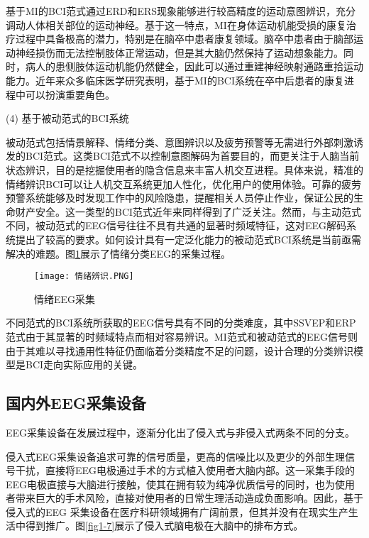 基于MI的BCI范式通过ERD和ERS现象能够进行较高精度的运动意图辨识，充分调动人体相关部位的运动神经。基于这一特点，MI在身体运动机能受损的康复治疗过程中具备极高的潜力，特别是在脑卒中患者康复领域\cite{1-44,1-45}。脑卒中患者由于脑部运动神经损伤而无法控制肢体正常运动，但是其大脑仍然保持了运动想象能力。同时，病人的患侧肢体运动机能仍然健全，因此可以通过重建神经映射通路重拾运动能力\cite{1-46,1-47}。近年来众多临床医学研究表明，基于MI的BCI系统在卒中后患者的康复进程中可以扮演重要角色\cite{1-48,1-102}。

(4) 基于被动范式的BCI系统

被动范式包括情景解释、情绪分类、意图辨识以及疲劳预警等无需进行外部刺激诱发的BCI范式\cite{1-36}。这类BCI范式不以控制意图解码为首要目的，而更关注于人脑当前状态辨识，目的是挖掘使用者的隐含信息来丰富人机交互进程。具体来说，精准的情绪辨识BCI可以让人机交互系统更加人性化，优化用户的使用体验。可靠的疲劳预警系统能够及时发现工作中的风险隐患，提醒相关人员停止作业，保证公民的生命财产安全。这一类型的BCI范式近年来同样得到了广泛关注\cite{3-28,3-29,3-30}。然而，与主动范式不同，被动范式的EEG信号往往不具有共通的显著时频域特征，这对EEG解码系统提出了较高的要求\cite{3-31}。如何设计具有一定泛化能力的被动范式BCI系统是当前亟需解决的难题。图\ref{fig1-6}展示了情绪分类EEG的采集过程。

\begin{figure}[h]
	\centering
	\texttt{[image: 情绪辨识.PNG]}
	\caption{情绪EEG采集\cite{1-49}}
	\label{fig1-6}
\end{figure}


不同范式的BCI系统所获取的EEG信号具有不同的分类难度，其中SSVEP和ERP范式由于其显著的时频域特点而相对容易辨识。MI范式和被动范式的EEG信号则由于其难以寻找通用性特征仍面临着分类精度不足的问题，设计合理的分类辨识模型是BCI走向实际应用的关键。


\subsection{国内外EEG采集设备}
EEG采集设备在发展过程中，逐渐分化出了侵入式\cite{1-50}与非侵入式\cite{1-51}两条不同的分支。

侵入式EEG采集设备追求可靠的信号质量，更高的信噪比以及更少的外部生理信号干扰，直接将EEG电极通过手术的方式植入使用者大脑内部。这一采集手段的EEG电极直接与大脑进行接触，使其在拥有较为纯净优质信号的同时，也为使用者带来巨大的手术风险，直接对使用者的日常生理活动造成负面影响。因此，基于侵入式的EEG 采集设备在医疗科研领域拥有广阔前景\cite{1-52}，但其并没有在现实生产生活中得到推广\cite{1-53}。图\ref{fig1-7}展示了侵入式脑电极在大脑中的排布方式。

